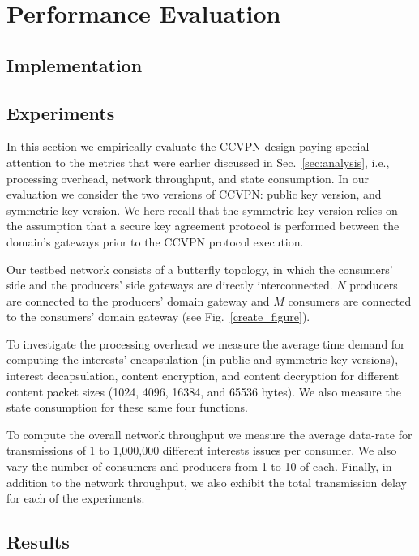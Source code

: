 \section{Performance Evaluation}

\subsection{Implementation}

\subsection{Experiments}

In this section we empirically evaluate the CCVPN design paying special attention to the metrics that were earlier discussed in Sec.~\ref{sec:analysis}, i.e., processing overhead, network throughput, and state consumption. In our evaluation we consider the two versions of CCVPN: public key version, and symmetric key version. We here recall that the symmetric key version relies on the assumption that a secure key agreement protocol is performed between the domain's gateways prior to the CCVPN protocol execution.

Our testbed network consists of a butterfly topology, in which the consumers' side and the producers' side gateways are directly interconnected. $N$ producers are connected to the producers' domain gateway and $M$ consumers are connected to the consumers' domain gateway (see Fig.~\ref{create_figure}).

To investigate the processing overhead we measure the average time demand for computing the interests' encapsulation (in public and symmetric key versions), interest decapsulation, content encryption, and content decryption for different content packet sizes (1024, 4096, 16384, and 65536 bytes). We also measure the state consumption for these same four functions.

To compute the overall network throughput we measure the average data-rate for transmissions of 1 to 1,000,000 different interests issues per consumer. We also vary the number of consumers and producers from 1 to 10 of each. Finally, in addition to the network throughput, we also exhibit the total transmission delay for each of the experiments.

\subsection{Results}


